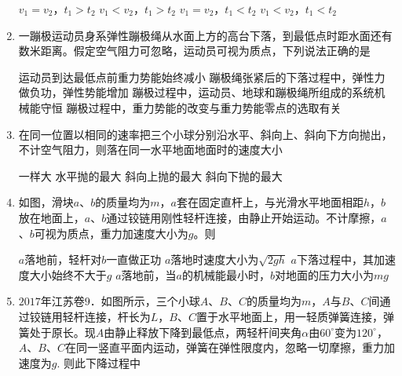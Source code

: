 \begin{enumerate}[leftmargin=0em]
\fourchoices
{$ v_{1} = v_{2} $，$ t_{1} > t_{2} $}
{$ v_{1} < v_{2} $，$ t_{1} > t_{2} $}
{$ v_{1} = v_{2} $，$ t_{1} < t_{2} $}
{$ v_{1} < v_{2} $，$ t_{1} < t_{2} $}



\item 
{}
一蹦极运动员身系弹性蹦极绳从水面上方的高台下落，到最低点时距水面还有数米距离。假定空气阻力可忽略，运动员可视为质点，下列说法正确的是  

\fourchoices
{运动员到达最低点前重力势能始终减小}
{蹦极绳张紧后的下落过程中，弹性力做负功，弹性势能增加}
{蹦极过程中，运动员、地球和蹦极绳所组成的系统机械能守恒}
{蹦极过程中，重力势能的改变与重力势能零点的选取有关}



\item 
{}
在同一位置以相同的速率把三个小球分别沿水平、斜向上、斜向下方向抛出，不计空气阻力，则落在同一水平地面地面时的速度大小  

\fourchoices
{一样大}
{水平抛的最大}
{斜向上抛的最大}
{斜向下抛的最大}


\item
{}
如图，滑块$ a $、$ b $的质量均为$ m $，$ a $套在固定直杆上，与光滑水平地面相距$ h $，$ b $放在地面上，$ a $、$ b $通过铰链用刚性轻杆连接，由静止开始运动。不计摩擦，$ a $、$ b $可视为质点，重力加速度大小为$ g $。则  
\begin{figure}[h!]
\centering

\end{figure}

\fourchoices
{$ a $落地前，轻杆对$ b $一直做正功}
{$ a $落地时速度大小为$\sqrt{2gh}$}
{$ a $下落过程中，其加速度大小始终不大于$ g $}
{$ a $落地前，当$ a $的机械能最小时，$ b $对地面的压力大小为$ mg $}


\item
$ 2017 $年江苏卷$ 9 $．如图所示，三个小球$ A $、$ B $、$ C $的质量均为$ m $，$ A $与$ B $、$ C $间通过铰链用轻杆连接，杆长为$ L $，$ B $、$ C $置于水平地面上，用一轻质弹簧连接，弹簧处于原长。现$ A $由静止释放下降到最低点，两轻杆间夹角$ \alpha $由$ 60 ^{ \circ } $变为$ 120 ^{ \circ } $，$ A $、$ B $、$ C $在同一竖直平面内运动，弹簧在弹性限度内，忽略一切摩擦，重力加速度为$ g $. 则此下降过程中  
\begin{figure}[h!]
\centering

\end{figure}



\end{enumerate}

